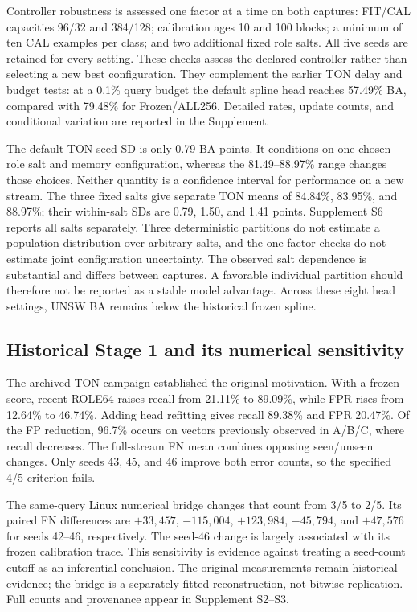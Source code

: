 Controller robustness is assessed one factor at a time on both captures: FIT/CAL capacities 96/32 and 384/128; calibration ages 10 and 100 blocks; a minimum of ten CAL examples per class; and two additional fixed role salts. All five seeds are retained for every setting. These checks assess the declared controller rather than selecting a new best configuration. They complement the earlier TON delay and budget tests: at a 0.1\% query budget the default spline head reaches 57.49\% BA, compared with 79.48\% for Frozen/ALL256. Detailed rates, update counts, and conditional variation are reported in the Supplement.


The default TON seed SD is only 0.79 BA points. It conditions on one chosen role salt and memory configuration, whereas the 81.49--88.97\% range changes those choices. Neither quantity is a confidence interval for performance on a new stream. The three fixed salts give separate TON means of 84.84\%, 83.95\%, and 88.97\%; their within-salt SDs are 0.79, 1.50, and 1.41 points. Supplement S6 reports all salts separately. Three deterministic partitions do not estimate a population distribution over arbitrary salts, and the one-factor checks do not estimate joint configuration uncertainty. The observed salt dependence is substantial and differs between captures. A favorable individual partition should therefore not be reported as a stable model advantage. Across these eight head settings, UNSW BA remains below the historical frozen spline.

\subsection{Historical Stage 1 and its numerical sensitivity}
The archived TON campaign established the original motivation. With a frozen score, recent ROLE64 raises recall from 21.11\% to 89.09\%, while FPR rises from 12.64\% to 46.74\%. Adding head refitting gives recall 89.38\% and FPR 20.47\%. Of the FP reduction, 96.7\% occurs on vectors previously observed in A/B/C, where recall decreases. The full-stream FN mean combines opposing seen/unseen changes. Only seeds 43, 45, and 46 improve both error counts, so the specified 4/5 criterion fails.

The same-query Linux numerical bridge changes that count from 3/5 to 2/5. Its paired FN differences are $+33{,}457$, $-115{,}004$, $+123{,}984$, $-45{,}794$, and $+47{,}576$ for seeds 42--46, respectively. The seed-46 change is largely associated with its frozen calibration trace. This sensitivity is evidence against treating a seed-count cutoff as an inferential conclusion. The original measurements remain historical evidence; the bridge is a separately fitted reconstruction, not bitwise replication. Full counts and provenance appear in Supplement S2--S3.

